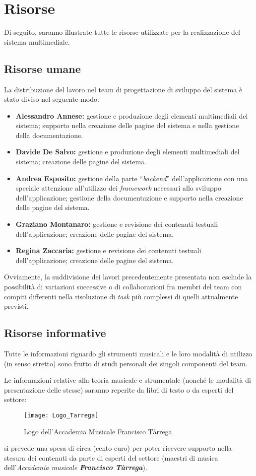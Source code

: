\section{Risorse}
Di seguito, saranno illustrate tutte le risorse utilizzate per la realizzazione del sistema multimediale.
\subsection{Risorse umane}
La distribuzione del lavoro nel team di progettazione di sviluppo del sistema è stato diviso nel seguente modo:
\begin{itemize}
	\item \textbf{Alessandro Annese:} gestione e produzione degli elementi multimediali del sistema; supporto nella creazione delle pagine del sistema e nella gestione della documentazione.
	\item \textbf{Davide De Salvo:} gestione e produzione degli elementi multimediali del sistema; creazione delle pagine del sistema.
	\item \textbf{Andrea Esposito:} gestione della parte ``\textit{backend}'' dell'applicazione con una speciale attenzione all'utilizzo dei \textit{framework} necessari allo sviluppo dell'applicazione; gestione della documentazione e supporto nella creazione delle pagine del sistema.
	\item \textbf{Graziano Montanaro:} gestione e revisione dei contenuti testuali dell'applicazione; creazione delle pagine del sistema.
	\item \textbf{Regina Zaccaria:} gestione e revisione dei contenuti testuali dell'applicazione; creazione delle pagine del sistema.
\end{itemize}
Ovviamente, la suddivisione dei lavori precedentemente presentata non esclude la possibilità di variazioni successive o di collaborazioni fra membri del team con compiti differenti nella risoluzione di \textit{task} più complessi di quelli attualmente previsti.

\subsection{Risorse informative}\label{sec:risorse-informative}
Tutte le informazioni riguardo gli strumenti musicali e le loro modalità di utilizzo (in senso stretto) sono frutto di studi personali dei singoli componenti del team. 

Le informazioni relative alla teoria musicale e strumentale (nonché le modalità di presentazione delle stesse) saranno reperite da libri di testo o da esperti del settore: 
\begin{wrapfigure}{r}{0.45\textwidth}
	\texttt{[image: Logo\_Tarrega]}
	\label{fig:logo-tarrega}
	\caption{Logo dell'Accademia Musicale Francisco Tàrrega}
\end{wrapfigure}
si prevede una spesa di circa  (cento euro) per poter ricevere supporto nella stesura dei contenuti da parte di esperti del settore (maestri di musica dell'\emph{Accademia musicale \textbf{Francisco Tàrrega}}). 

